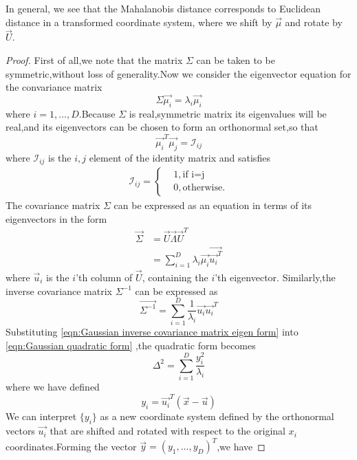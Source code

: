 In general, we see that the Mahalanobis distance corresponds to Euclidean distance in a transformed coordinate system, where we shift by $\vec{\mu}$ and rotate by $\vec{U}$.
\begin{proof}
	First of all,we note that the matrix $\Sigma$ can be taken to be symmetric,without loss of generality.Now we consider the eigenvector equation for the convariance matrix
	\begin{equation}
	\Sigma\vec{\mu_i} = \lambda_i\vec{\mu_i}
	\end{equation}
	where $ i = 1,...,D $.Because $\Sigma$ is real,symmetric matrix its eigenvalues will be real,and its eigenvectors can be chosen to form an orthonormal set,so that
	\begin{equation}
	\vec{\mu_i}^T\vec{\mu_j} = \mathcal{I}_{ij}
	\end{equation}
	where $\mathcal{I}_{ij}$ is the $i,j$ element of the identity matrix and satisfies 
	\begin{align}
	\mathcal{I}_{ij} = \begin{cases}
	& 1,\text{if i=j} \\
	& 0,\text{otherwise}.
	\end{cases}
	\end{align}
	The covariance matrix $\Sigma$ can be expressed as an equation in terms of its eigenvectors in the form
	\begin{eqnarray}
	\vec{\Sigma} & =\vec{U}\vec{\Lambda}\vec{U}^T \\
	& = \sum\limits_{i=1}^{D}\lambda_i\vec{\mu_i}\vec{\vec{u_i}^T}
	\end{eqnarray}
	where $\vec{u}_i$ is the $i$'th column of $\vec{U}$, containing the $i$'th eigenvector.
	Similarly,the inverse covariance matrix $\Sigma^{-1}$ can be expressed as 
	\begin{equation}\label{eqn:Gaussian inverse covariance matrix eigen form}
	\vec{\Sigma^{-1}} = \sum\limits_{i=1}^{D}\dfrac{1}{\lambda_i}\vec{u_i}\vec{u_i}^T
	\end{equation}
	Substituting \ref{eqn:Gaussian inverse covariance matrix eigen form} into \ref{eqn:Gaussian quadratic form} ,the quadratic form becomes
	\begin{equation}
	\Delta^2 = \sum\limits_{i=1}^{D}\dfrac{y_i^2}{\lambda_i}
	\end{equation}
	where we have defined 
	\begin{equation}
	y_i = \vec{u_i}^T(\vec{x}-\vec{u})
	\end{equation}
	We can interpret $\{y_i\}$ as a new coordinate system defined by the orthonormal vectors $\vec{u_i}$ that are shifted and rotated with respect to the original $x_i$ coordinates.Forming the vector $\vec{y}=(y_1,...,y_D)^T$,we have

\end{proof}
